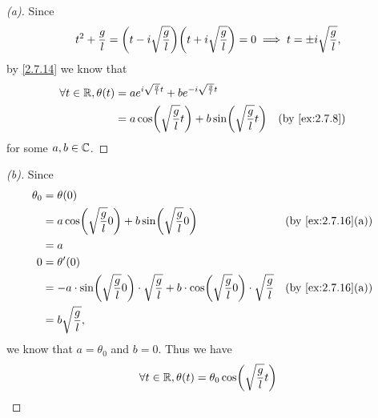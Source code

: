 \begin{proof}[(a)]
  Since
  \[
    t^2 + \frac{g}{l} = \pa{t - i \sqrt{\frac{g}{l}}} \pa{t + i \sqrt{\frac{g}{l}}} = 0 \implies t = \pm i \sqrt{\frac{g}{l}},
  \]
  by \cref{2.7.14} we know that
  \begin{align*}
    \forall t \in \R, \theta(t) & = a e^{i \sqrt{\frac{g}{l}} t} + b e^{- i \sqrt{\frac{g}{l}} t}                        \\
                                & = a \cos\pa{\sqrt{\frac{g}{l}} t} + b \sin\pa{\sqrt{\frac{g}{l}} t} &  & \by{ex:2.7.8}
  \end{align*}
  for some \(a, b \in \mathbb{C}\).
\end{proof}

\begin{proof}[(b)]
  Since
  \begin{align*}
    \theta_0 & = \theta(0)                                                                                                                                               \\
             & = a \cos\pa{\sqrt{\frac{g}{l}} 0} + b \sin\pa{\sqrt{\frac{g}{l}} 0}                                                                &  & \by{ex:2.7.16}[a] \\
             & = a                                                                                                                                                       \\
    0        & = \theta'(0)                                                                                                                                              \\
             & = -a \cdot \sin\pa{\sqrt{\frac{g}{l}} 0} \cdot \sqrt{\frac{g}{l}} + b \cdot \cos\pa{\sqrt{\frac{g}{l}} 0} \cdot \sqrt{\frac{g}{l}} &  & \by{ex:2.7.16}[a] \\
             & = b \sqrt{\frac{g}{l}},
  \end{align*}
  we know that \(a = \theta_0\) and \(b = 0\).
  Thus we have
  \[
    \forall t \in \R, \theta(t) = \theta_0 \cos\pa{\sqrt{\frac{g}{l}} t}
  \]
\end{proof}

